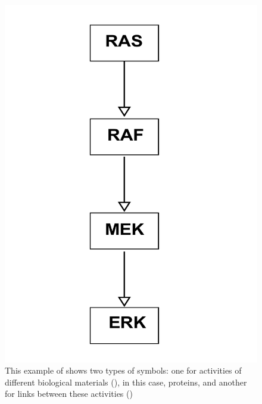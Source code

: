 \begin{figure}[H]
\centering
\vspace*{-0.75em}
\includegraphics[scale=0.35]{examples/ras-pathway}
\caption{This example of \AF shows two types of symbols: one for activities of different biological materials (), in this case, proteins, and another for links between these activities ()}
\label{fig:af:1}
\end{figure}

